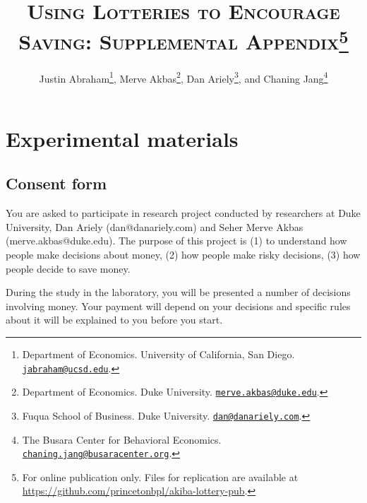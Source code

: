 \documentclass[11pt]{article}
\begin{document}
\title{\textsc{Using Lotteries to Encourage Saving: Supplemental Appendix}\protect\footnote{For online publication only. Files for replication are available at \url{https://github.com/princetonbpl/akiba-lottery-pub}.}}

\author{Justin Abraham\thanks{Department of Economics. University of California, San Diego. \protect\href{mailto:jabraham@ucsd.edu}{\nolinkurl{jabraham@ucsd.edu}}.}, Merve Akbas\thanks{Department of Economics. Duke University. \protect\href{mailto:merve.akbas@duke.edu}{\nolinkurl{merve.akbas@duke.edu}}.}, Dan Ariely\thanks{Fuqua School of Business. Duke University. \protect\href{mailto:dan@danariely.com}{\nolinkurl{dan@danariely.com}}.}, and Chaning Jang\thanks{The Busara Center for Behavioral Economics. \protect\href{mailto:chaning.jang@busaracenter.org}{\nolinkurl{chaning.jang@busaracenter.org}}.}} %

\maketitle

\newpage

\tableofcontents

\newpage

\appendix

\section{Experimental materials}


    \subsection{Consent form}

        \noindent You are asked to participate in research project conducted by researchers at Duke University, Dan Ariely (dan@danariely.com) and Seher Merve Akbas (merve.akbas@duke.edu). The purpose of this project is (1) to understand how people make decisions about money, (2) how people make risky decisions, (3) how people decide to save money.

        \vspace{5mm}

        \noindent During the study in the laboratory, you will be presented a number of decisions involving money. Your payment will depend on your decisions and specific rules about it will be explained to you before you start.
\end{document}
